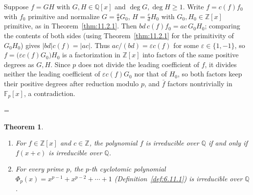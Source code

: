 \documentclass[11pt]{article}
\makeatletter
\theoremstyle{ntstyle}
\newtheorem{theorem}{Theorem}[subsection]
\newcommand{\statementitems}{\mbox{}}
\let\nt@closedisplay\]
\def\nt@guardedclose{\@ifnextchar\par{\nt@closeafterpar}{\@ifnextchar\end{\postdisplaypenalty\@M\nt@closedisplay}{\nt@closedisplay}}}
\def\nt@closeafterpar\par{\@ifnextchar\par{\nt@closeafterpar}{\@ifnextchar\end{\postdisplaypenalty\@M\nt@closedisplay\par}{\nt@closedisplay\par}}}
\renewenvironment{proof}[1][\proofname]{\par
  \pushQED{\qed}\normalfont\topsep\medskipamount\edef\nt@afterproof{\@endparpenalty=\the\@endparpenalty\relax}\@beginparpenalty\@M\@endparpenalty\@M\let\]\nt@guardedclose\trivlist\item[]\textit{#1\@addpunct{.}} \ignorespaces}{\ifvmode\addpenalty\@M\fi\popQED\nt@afterproof\endtrivlist\@endpefalse}
\makeatother
\begin{document}
\begin{proof} Suppose $f = GH$ with $G,
		H\in\mathbb{Q}[x]$ and $\deg G, \deg H\ge1$. Write $f = c(f)f_0$
	with $f_0$ primitive and normalize $G = \tfrac{a}{b}G_0$, $H =
		\tfrac{c}{d}H_0$ with $G_0, H_0\in\mathbb{Z}[x]$ primitive, as in
	Theorem~\ref{thm:11.2.1}. Then $bd\,c(f)f_0 = ac\,G_0H_0$; comparing
	the contents of both sides (using Theorem~\ref{thm:11.2.1} for the
	primitivity of $G_0H_0$) gives $|bd|c(f) = |ac|$. Thus
	$ac/(bd)=\varepsilon c(f)$ for some $\varepsilon\in\{1,-1\}$, so
	$f=\big(\varepsilon c(f)G_0\big)H_0$ is a factorization in
	$\mathbb{Z}[x]$ into factors of the same positive degrees as
	$G, H$. Since $p$ does not divide the leading coefficient of $f$, it
	divides neither the leading coefficient of $\varepsilon c(f)G_0$ nor that of $H_0$, so both
	factors keep their positive degrees after reduction modulo $p$, and
	$\bar f$ factors nontrivially in $\mathbb{F}_p[x]$, a
	contradiction.

\end{proof}
\begin{theorem}\label{thm:11.3.3}\statementitems
	\begin{enumerate}[label={\alph*)}]
		\item For $f\in\mathbb{Z}[x]$ and $c\in\mathbb{Z}$, the polynomial $f$ is
		      irreducible over $\mathbb{Q}$ if and only if $f(x+c)$ is
		      irreducible over $\mathbb{Q}$.
		\item For every prime $p$, the $p$-th cyclotomic polynomial
		      $\Phi_p(x)=x^{p-1}+x^{p-2}+\cdots+1$
		      (Definition~\ref{def:6.11.1}) is irreducible over $\mathbb{Q}$.
	\end{enumerate}

\end{theorem}
\end{document}
